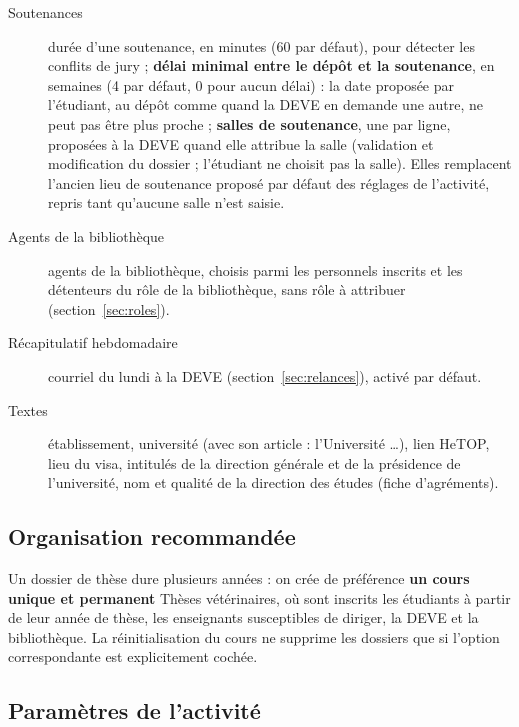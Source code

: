 \documentclass[11pt,a4paper]{article}
\begin{document}
\begin{description}
  \item[Soutenances] durée d'une soutenance, en minutes (60 par défaut), pour
        détecter les conflits de jury ; \textbf{délai minimal entre le dépôt et
        la soutenance}, en semaines (4 par défaut, 0 pour aucun délai) : la date
        proposée par l'étudiant, au dépôt comme quand la DEVE en demande une
        autre, ne peut pas être plus proche ; \textbf{salles de soutenance}, une par
        ligne, proposées à la DEVE quand elle attribue la salle (validation et
        modification du dossier ; l'étudiant ne choisit pas la salle). Elles remplacent
        l'ancien \og lieu de soutenance proposé par défaut\fg{} des réglages
        de l'activité, repris tant qu'aucune salle n'est saisie.
  \item[Agents de la bibliothèque] agents de la bibliothèque, choisis parmi
        les personnels inscrits et les détenteurs du rôle de la bibliothèque,
        sans rôle à attribuer (section~\ref{sec:roles}).
  \item[Récapitulatif hebdomadaire] courriel du lundi à la DEVE
        (section~\ref{sec:relances}), activé par défaut.
  \item[Textes] établissement, université (avec son article : \og
        l'Université \ldots\fg{}), lien HeTOP, lieu du visa, intitulés de la
        direction générale et de la présidence de l'université, nom et qualité
        de la direction des études (fiche d'agréments).
\end{description}

\subsection{Organisation recommandée}

Un dossier de thèse dure plusieurs années : on crée de préférence \textbf{un
cours unique et permanent} \og Thèses vétérinaires\fg{}, où sont inscrits les
étudiants à partir de leur année de thèse, les enseignants susceptibles de
diriger, la DEVE et la bibliothèque. La réinitialisation du cours ne supprime
les dossiers que si l'option correspondante est explicitement cochée.

\subsection{Paramètres de l'activité}

\end{document}
